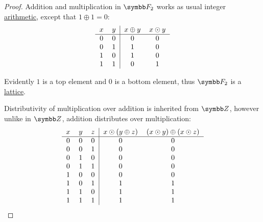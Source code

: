 \begin{proof}
  Addition and multiplication in \( \BF_2 \) works as usual integer \hyperref[def:integers]{arithmetic}, except that \( 1 \oplus 1 = 0 \):
  \begin{equation*}
    \begin{tabular}{c c | c c}
      \( x \)    & \( y \)    & \( x \oplus y \) & \( x \odot y \) \\
      \hline
      \( 0 \)    & \( 0 \)    & \( 0 \)          & \( 0 \) \\
      \( 0 \)    & \( 1 \)    & \( 1 \)          & \( 0 \) \\
      \( 1 \)    & \( 0 \)    & \( 1 \)          & \( 0 \) \\
      \( 1 \)    & \( 1 \)    & \( 0 \)          & \( 1 \)
    \end{tabular}
  \end{equation*}

  Evidently \( 1 \) is a top element and \( 0 \) is a bottom element, thus \( \BF_2 \) is a \hyperref[def:lattice]{lattice}.

  Distributivity of multiplication over addition is inherited from \( \BZ \), however unlike in \( \BZ \), addition distributes over multiplication:
  \begin{equation*}
    \begin{tabular}{c c c | c c}
      \( x \)    & \( y \)    & \( z \)    & \(x \odot (y \oplus z) \) & \( (x \odot y) \oplus (x \odot z) \) \\
      \hline
      \( 0 \)    & \( 0 \)    & \( 0 \)    & \( 0 \)                   & \( 0 \) \\
      \( 0 \)    & \( 0 \)    & \( 1 \)    & \( 0 \)                   & \( 0 \) \\
      \( 0 \)    & \( 1 \)    & \( 0 \)    & \( 0 \)                   & \( 0 \) \\
      \( 0 \)    & \( 1 \)    & \( 1 \)    & \( 0 \)                   & \( 0 \) \\
      \( 1 \)    & \( 0 \)    & \( 0 \)    & \( 0 \)                   & \( 0 \) \\
      \( 1 \)    & \( 0 \)    & \( 1 \)    & \( 1 \)                   & \( 1 \) \\
      \( 1 \)    & \( 1 \)    & \( 0 \)    & \( 1 \)                   & \( 1 \) \\
      \( 1 \)    & \( 1 \)    & \( 1 \)    & \( 1 \)                   & \( 1 \)
    \end{tabular}
  \end{equation*}


\end{proof}
